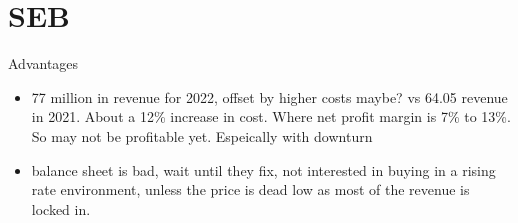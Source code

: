 \section{SEB}

Advantages
\begin{itemize}
    \item 77 million in revenue for 2022, offset by higher costs maybe? vs 64.05 revenue in 2021. About a 12\% increase in cost. Where net profit margin is 7\% to 13\%. So may not be profitable yet. Espeically with downturn
    \item balance sheet is bad, wait until they fix, not interested in buying in a rising rate environment, unless the price is dead low as most of the revenue is locked in.
\end{itemize}